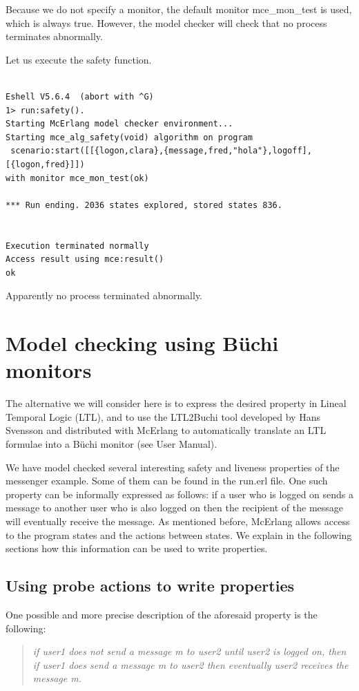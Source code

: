 \documentclass[a4paper]{article}
\newcommand{\monTest}{mce\_mon\_test\xspace}
\begin{document}
Because we do not specify a monitor, the default monitor \monTest is
used, which is always true. However, the model checker will check that
no process terminates abnormally.

Let us execute the safety function.

\begin{verbatim}

Eshell V5.6.4  (abort with ^G)
1> run:safety().
Starting McErlang model checker environment...
Starting mce_alg_safety(void) algorithm on program
 scenario:start([[{logon,clara},{message,fred,"hola"},logoff],[{logon,fred}]])
with monitor mce_mon_test(ok)

*** Run ending. 2036 states explored, stored states 836.


Execution terminated normally
Access result using mce:result()
ok
\end{verbatim}
Apparently no process terminated abnormally.

\section{Model checking using B\"{u}chi monitors}
\label{buchi}

The alternative we will consider here is to express the desired
property in Lineal Temporal Logic (LTL), and to use the LTL2Buchi tool
developed by Hans Svensson and distributed with McErlang to
automatically translate an LTL formulae into a B\"uchi monitor (see
User Manual).

We have model checked several interesting safety and liveness
properties of the messenger example. Some of them can be found in the
run.erl file. One such property can be informally expressed as
follows: if a user who is logged on sends a message to another user
who is also logged on then the recipient of the message will
eventually receive the message. As mentioned before, McErlang allows
access to the program states and the actions between states. We
explain in the following sections how this information can be used to
write properties.

\subsection{Using probe actions to write properties}

One possible and more precise description of
the aforesaid property is the following: 

\begin{quote}
\em if user1 does not send a
message m to user2 until user2 is logged on,
then if user1 does send a
message m to user2 then eventually user2 receives the message m.
\end{quote}
\end{document}
